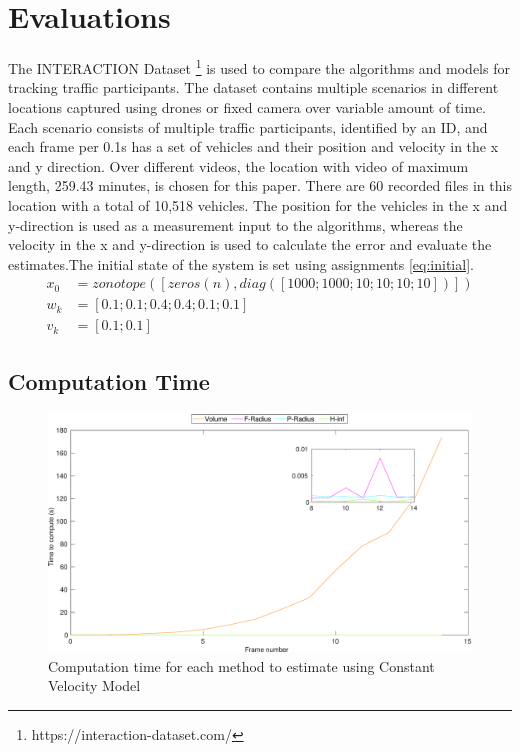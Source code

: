 \chapter{Evaluations} \label{ch:result}
The INTERACTION Dataset \footnote{https://interaction-dataset.com/} is used to compare the algorithms and models for tracking traffic participants. The dataset contains multiple scenarios in different locations captured using drones or fixed camera over variable amount of time. Each scenario consists of multiple traffic participants, identified by an ID, and each frame per 0.1s has a set of vehicles and their position and velocity in the x and y direction. Over different videos, the location with video of maximum length, 259.43 minutes, is chosen for this paper. There are 60 recorded files in this location with a total of 10,518 vehicles. The position for the vehicles in the x and y-direction is used as a measurement input to the algorithms, whereas the velocity in the x and y-direction is used to calculate the error and evaluate the estimates.The initial state of the system is set using assignments \eqref{eq:initial}.
\begin{equation}
\label{eq:initial}
\begin{split}
x_0 &= zonotope([zeros(n), diag([1000;1000;10;10;10;10])])\\
w_k &= [0.1;0.1;0.4;0.4;0.1;0.1]\\
v_k &= [0.1;0.1]
\end{split}
\end{equation}

\section{Computation Time}
\begin{figure}[htbp]
\centering
\includegraphics[width=\linewidth]{figures/timegraphh}
\caption{Computation time for each method to estimate using Constant Velocity Model}
\label{fig:timegraph}
\end{figure}

